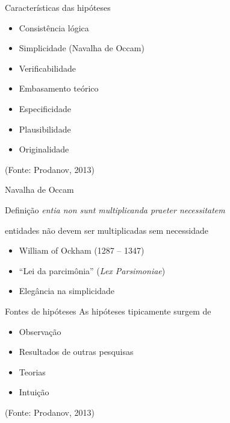 \documentclass{beamer}
\begin{document}
\begin{frame}{Características das hipóteses}
  \begin{itemize}
    \footnotesize
  \item Consistência lógica
    \medskip
  \item Simplicidade (Navalha de Occam)
    \medskip
  \item Verificabilidade
    \medskip
  \item Embasamento teórico
    \medskip
  \item Especificidade
    \medskip
  \item Plausibilidade
    \medskip
  \item Originalidade
  \end{itemize}

  \vfill
  \scriptsize
  \hfill (Fonte: Prodanov, 2013)
\end{frame}

\begin{frame}{Navalha de Occam}
  \begin{block}{Definição}
    {\em entia non sunt multiplicanda praeter necessitatem}

    \bigskip
    entidades não devem ser multiplicadas sem necessidade
  \end{block}
  \bigskip
  \begin{itemize}
    \footnotesize
  \item William of Ockham (1287 -- 1347)
    \medskip
  \item ``Lei da parcimônia'' ({\em Lex Parsimoniae})
    \medskip
  \item Elegância na simplicidade
  \end{itemize}
\end{frame}

\begin{frame}{Fontes de hipóteses}
  As hipóteses tipicamente surgem de
  \bigskip
  \begin{itemize}
    \footnotesize
  \item Observação
    \medskip
  \item Resultados de outras pesquisas
    \medskip
  \item Teorias
    \medskip
  \item Intuição
  \end{itemize}

  \vfill
  \scriptsize
  \hfill (Fonte: Prodanov, 2013)
\end{frame}
\end{document}
